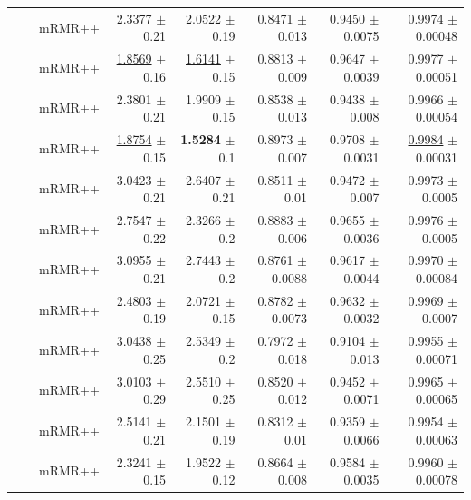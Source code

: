 \begin{longtable}{llp{}rrrrr}
 &  & mRMR++ & 2.3377 {\scriptsize $\pm$ 0.21} & 2.0522 {\scriptsize $\pm$ 0.19} & 0.8471 {\scriptsize $\pm$ 0.013} & 0.9450 {\scriptsize $\pm$ 0.0075} & 0.9974 {\scriptsize $\pm$ 0.00048} \\
 &  & mRMR++ & \underline{1.8569} {\scriptsize $\pm$ 0.16} & \underline{1.6141} {\scriptsize $\pm$ 0.15} & 0.8813 {\scriptsize $\pm$ 0.009} & 0.9647 {\scriptsize $\pm$ 0.0039} & 0.9977 {\scriptsize $\pm$ 0.00051} \\
 &  & mRMR++ & 2.3801 {\scriptsize $\pm$ 0.21} & 1.9909 {\scriptsize $\pm$ 0.15} & 0.8538 {\scriptsize $\pm$ 0.013} & 0.9438 {\scriptsize $\pm$ 0.008} & 0.9966 {\scriptsize $\pm$ 0.00054} \\
 &  & mRMR++ & \underline{1.8754} {\scriptsize $\pm$ 0.15} & \textbf{1.5284} {\scriptsize $\pm$ 0.1} & 0.8973 {\scriptsize $\pm$ 0.007} & 0.9708 {\scriptsize $\pm$ 0.0031} & \underline{0.9984} {\scriptsize $\pm$ 0.00031} \\
 &  & mRMR++ & 3.0423 {\scriptsize $\pm$ 0.21} & 2.6407 {\scriptsize $\pm$ 0.21} & 0.8511 {\scriptsize $\pm$ 0.01} & 0.9472 {\scriptsize $\pm$ 0.007} & 0.9973 {\scriptsize $\pm$ 0.0005} \\
 &  & mRMR++ & 2.7547 {\scriptsize $\pm$ 0.22} & 2.3266 {\scriptsize $\pm$ 0.2} & 0.8883 {\scriptsize $\pm$ 0.006} & 0.9655 {\scriptsize $\pm$ 0.0036} & 0.9976 {\scriptsize $\pm$ 0.0005} \\
 &  & mRMR++ & 3.0955 {\scriptsize $\pm$ 0.21} & 2.7443 {\scriptsize $\pm$ 0.2} & 0.8761 {\scriptsize $\pm$ 0.0088} & 0.9617 {\scriptsize $\pm$ 0.0044} & 0.9970 {\scriptsize $\pm$ 0.00084} \\
 &  & mRMR++ & 2.4803 {\scriptsize $\pm$ 0.19} & 2.0721 {\scriptsize $\pm$ 0.15} & 0.8782 {\scriptsize $\pm$ 0.0073} & 0.9632 {\scriptsize $\pm$ 0.0032} & 0.9969 {\scriptsize $\pm$ 0.0007} \\
 &  & mRMR++ & 3.0438 {\scriptsize $\pm$ 0.25} & 2.5349 {\scriptsize $\pm$ 0.2} & 0.7972 {\scriptsize $\pm$ 0.018} & 0.9104 {\scriptsize $\pm$ 0.013} & 0.9955 {\scriptsize $\pm$ 0.00071} \\
 &  & mRMR++ & 3.0103 {\scriptsize $\pm$ 0.29} & 2.5510 {\scriptsize $\pm$ 0.25} & 0.8520 {\scriptsize $\pm$ 0.012} & 0.9452 {\scriptsize $\pm$ 0.0071} & 0.9965 {\scriptsize $\pm$ 0.00065} \\
 &  & mRMR++ & 2.5141 {\scriptsize $\pm$ 0.21} & 2.1501 {\scriptsize $\pm$ 0.19} & 0.8312 {\scriptsize $\pm$ 0.01} & 0.9359 {\scriptsize $\pm$ 0.0066} & 0.9954 {\scriptsize $\pm$ 0.00063} \\
 &  & mRMR++ & 2.3241 {\scriptsize $\pm$ 0.15} & 1.9522 {\scriptsize $\pm$ 0.12} & 0.8664 {\scriptsize $\pm$ 0.008} & 0.9584 {\scriptsize $\pm$ 0.0035} & 0.9960 {\scriptsize $\pm$ 0.00078} \\

\end{longtable}
